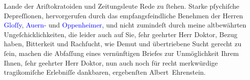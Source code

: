                Lande der Ariſtokratoiden und Zeitungsleute Rede zu ſtehen. Starke pſychiſche
               Depreſſionen, hervorgerufen durch das empfangsfeindliche Benehmen der Herren \textcolor{blue}{Gloſſy}{}\ledrightnote{\textcolor{blue}{Karl Glossy}}, \textcolor{blue}{Auern-}{}\ledrightnote{\textcolor{blue}{Raoul Auernheimer}}
               und \textcolor{blue}{Oppenheimer}{}\ledrightnote{\textcolor{blue}{Felix von Oppenheimer}}, und {\pb}nicht zumindeſt durch meine altbewährten
               Ungeſchicklichkeiten, die leider auch auf Sie, ſehr geehrter Herr Doktor, Bezug
               haben, Bitterkeit und Rachſucht, wie Demut und übertriebene Sucht gerecht zu ſein,
               machen die Abfaſſung eines vernünftigen Briefes zur Unmöglichkeit Ihrem Ihnen, ſehr
               geehrter Herr Doktor, nun auch noch für recht merkwürdige tragikomiſche Erlebniſſe
               dankbaren, ergebenſten\pend
           \pstart \spacefill\mbox{Albert Ehrenstein.}\pend{}\endnumbering{}  
      